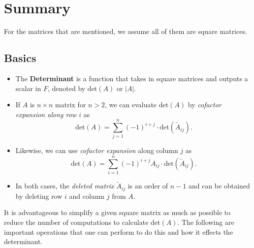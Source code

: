 \section{Summary}
For the matrices that are mentioned, we assume all of them are square matrices.
\subsection{Basics}
\begin{itemize}
    \item The \textbf{Determinant} is a function that takes in square matrices and outputs a scalar in \( F  \), denoted by \( \text{det}(A) \) or \( | A |  \). 
    \item If \( A  \) is \( n \times n \) matrix for \( n > 2  \), we can evaluate \( \text{det}(A) \) by \textit{cofactor expansion along row \( i \)} as 
        \[  \text{det}(A) = \sum_{ j=1 }^{ n  } (-1)^{i+j} \cdot \text{det}({\tilde{A}}_{ij}). \]
    \item Likewise, we can use \textit{cofactor expansion} along column \( j  \) as
        \[  \text{det}(A) = \sum_{ i=1 }^{ n } (-1)^{i + j} {A}_{ij} \cdot \text{det}({\tilde{A}}_{ij}). \]
    \item In both cases, the \textit{deleted matrix} \( {\tilde{A}}_{ij} \) is an order of \( n - 1 \) and can be obtained by deleting row \(  i  \) and column \(  j  \) from \( A  \).
\end{itemize}
It is advantageous to simplify a given square matrix as much as possible to reduce the number of computations to calculate \( \text{det}(A) \). The following are important operations that one can perform to do this and how it effects the determinant.
